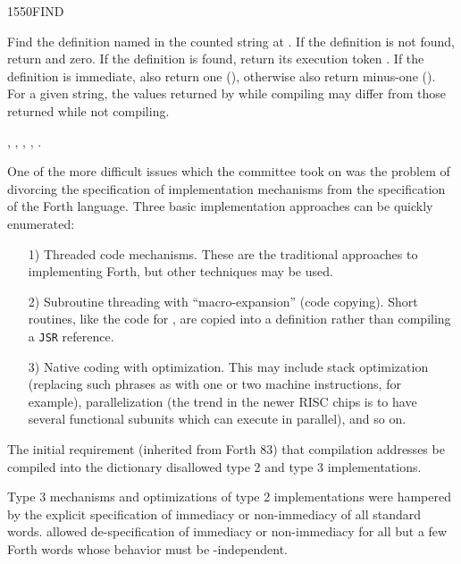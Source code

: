 \enlargethispage{4ex}
\begin{worddef}{1550}{FIND}
\item {}

	Find the definition named in the counted string at .
	If the definition is not found, return  and zero.
	If the definition is found, return its execution token .
	If the definition is immediate, also return one (),
	otherwise also return minus-one (). For a given string,
	the values returned by  while compiling may differ
	from those returned while not compiling.

\see {},
	,
	,
	,
	.

	\begin{rationale} %
		One of the more difficult issues which the committee took on
		was the problem of divorcing the specification of
		implementation mechanisms from the specification of the
		Forth language. Three basic implementation approaches can be
		quickly enumerated:

		\begin{enumerate}
		\item[1)] Threaded code mechanisms.
			These are the traditional approaches to implementing Forth,
			but other techniques may be used.

		\item[2)] Subroutine threading with ``macro-expansion'' (code
			copying). Short routines, like the code for ,
			are copied into a definition rather than compiling a
			\texttt{JSR} reference.

		\item[3)] Native coding with optimization.
			This may include stack optimization (replacing such phrases
			as   \word{+} with one or two machine
			instructions, for example), parallelization (the trend in
			the newer RISC chips is to have several functional subunits
			which can execute in parallel), and so on.
		\end{enumerate}

		The initial requirement (inherited from Forth 83) that
		compilation addresses be compiled into the dictionary
		disallowed type 2 and type 3 implementations.

		Type 3 mechanisms and optimizations of type 2 implementations
		were hampered by the explicit specification of immediacy or
		non-immediacy of all standard words.  allowed
		de-spec\-i\-fi\-ca\-tion of immediacy or non-immediacy for all but a
		few Forth words whose behavior must be -independent.


\end{rationale}
\end{worddef}
